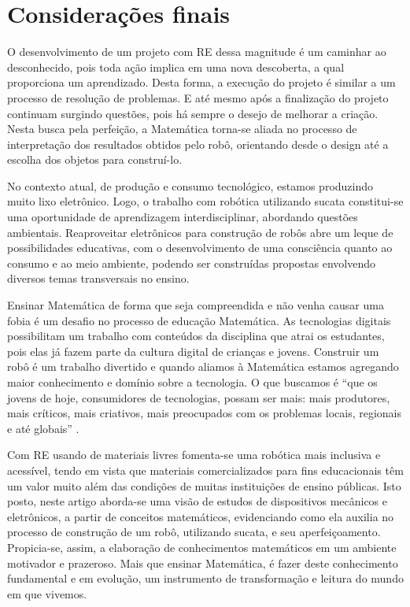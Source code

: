 \documentclass{textolivre}
\begin{document}
\section{Considerações finais}\label{sec-considera}
O desenvolvimento de um projeto com RE dessa magnitude é um caminhar ao
desconhecido, pois toda ação implica em uma nova descoberta, a qual proporciona
um aprendizado. Desta forma, a execução do projeto é similar a um processo de
resolução de problemas. E até mesmo após a finalização do projeto continuam
surgindo questões, pois há sempre o desejo de melhorar a criação. Nesta busca
pela perfeição, a Matemática torna-se aliada no processo de interpretação dos
resultados obtidos pelo robô, orientando desde o design até a escolha dos
objetos para construí-lo.

No contexto atual, de produção e consumo tecnológico, estamos produzindo muito
lixo eletrônico. Logo, o trabalho com robótica utilizando sucata constitui-se
uma oportunidade de aprendizagem interdisciplinar, abordando questões
ambientais. Reaproveitar eletrônicos para construção de robôs abre um leque de
possibilidades educativas, com o desenvolvimento de uma consciência quanto ao
consumo e ao meio ambiente, podendo ser construídas propostas envolvendo
diversos temas transversais no ensino.

Ensinar Matemática de forma que seja compreendida e não venha causar uma fobia
é um desafio no processo de educação Matemática. As tecnologias digitais
possibilitam um trabalho com conteúdos da disciplina que atrai os estudantes,
pois elas já fazem parte da cultura digital de crianças e jovens. Construir um
robô é um trabalho divertido e quando aliamos à Matemática estamos agregando
maior conhecimento e domínio sobre a tecnologia. O que buscamos é “que os
jovens de hoje, consumidores de tecnologias, possam ser mais: mais produtores,
mais críticos, mais criativos, mais preocupados com os problemas locais,
regionais e até globais” \cite[p. 286]{barbosa2016}.

Com RE usando de materiais livres fomenta-se uma robótica mais inclusiva e
acessível, tendo em vista que materiais comercializados para fins educacionais
têm um valor muito além das condições de muitas instituições de ensino
públicas. Isto posto, neste artigo aborda-se uma visão de estudos de
dispositivos mecânicos e eletrônicos, a partir de conceitos matemáticos,
evidenciando como ela auxilia no processo de construção de um robô, utilizando
sucata, e seu aperfeiçoamento. Propicia-se, assim, a elaboração de
conhecimentos matemáticos em um ambiente motivador e prazeroso. Mais que
ensinar Matemática, é fazer deste conhecimento fundamental e em evolução, um
instrumento de transformação e leitura do mundo em que vivemos.
\end{document}

